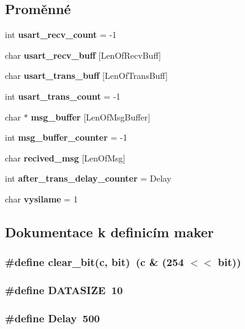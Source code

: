 \subsection*{Proměnné}
\begin{CompactItemize}
\item 
int {\bf usart\_\-recv\_\-count} = -1
\item 
char {\bf usart\_\-recv\_\-buff} [LenOfRecvBuff]
\item 
char {\bf usart\_\-trans\_\-buff} [LenOfTransBuff]
\item 
int {\bf usart\_\-trans\_\-count} = -1
\item 
char $\ast$ {\bf msg\_\-buffer} [LenOfMsgBuffer]
\item 
int {\bf msg\_\-buffer\_\-counter} = -1
\item 
char {\bf recived\_\-msg} [LenOfMsg]
\item 
int {\bf after\_\-trans\_\-delay\_\-counter} = Delay
\item 
char {\bf vysilame} = 1
\end{CompactItemize}


\subsection{Dokumentace k definicím maker}
\subsubsection{\setlength{\rightskip}{0pt plus 5cm}\#define clear\_\-bit(c, bit)~(c \& (254 $<$$<$ bit))}\label{usart_8c_977e1538a0e8f01bd867a9c98cbaffb3}


\subsubsection{\setlength{\rightskip}{0pt plus 5cm}\#define DATASIZE~10}\label{usart_8c_cb383144a04ad304680b840cd65af5a5}


\subsubsection{\setlength{\rightskip}{0pt plus 5cm}\#define Delay~500}\label{usart_8c_da5117fc4f5cae9ee7091b2fd013ad02}


